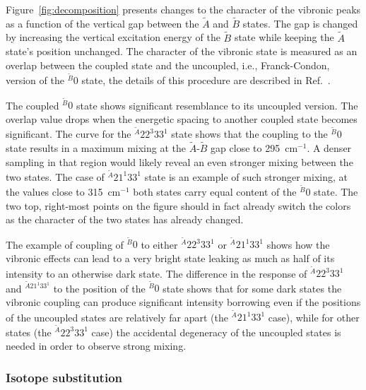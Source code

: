 \documentclass{article}
\begin{document}
Figure~\ref{fig:decomposition} presents changes to the character of the
vibronic peaks as a function of the vertical gap between the $\tilde{A}$ and
$\tilde{B}$ states. The gap is changed by increasing the vertical excitation
energy of the $\tilde{B}$ state while keeping the $\tilde{A}$ state's position
unchanged. The character of the vibronic state is measured as an overlap
between the coupled state and the uncoupled, i.e., Franck-Condon, version of
the $^{\tilde{B}}0$ state, the details of this procedure are described in
Ref.~\cite{Wojcik:ozone:2024}.

The coupled $^{\tilde{B}}0$ state shows significant resemblance to its
uncoupled version. The overlap value drops when the energetic spacing to
another coupled state becomes significant. The curve for the $^{\tilde{A}}22^3
33^1$ state shows that the coupling to the $^{\tilde{B}}0$ state results in a
maximum mixing at the $\tilde{A}$-$\tilde{B}$ gap close to 295~cm$^{-1}$. A
denser sampling in that region would likely reveal an even stronger mixing
between the two states. The case of $^{\tilde{A}}21 ^1 33 ^1$ state is an
example of such stronger mixing, at the values close to 315~cm$^{-1}$ both
states carry equal content of the $^{\tilde{B}}0$ state. The two top,
right-most points on the figure should in fact already switch the colors as the
character of the two states has already changed.

The example of coupling of $^{\tilde{B}}0$ to either $^{\tilde{A}}22^3 33^1$ or
$^{\tilde{A}}21 ^1 33 ^1$ shows how the vibronic effects can lead to a very
bright state leaking as much as half of its intensity to an otherwise dark
state. The difference in the response of $^{\tilde{A}}22 ^3 33 ^1$ and
$^{\tilde{A}21^1 33^1}$ to the position of the $^{\tilde{B}}0$ state shows that
for some dark states the vibronic coupling can produce significant intensity
borrowing even if the positions of the uncoupled states are relatively far
apart (the $^{\tilde{A}}21 ^1 33 ^1$ case), while for other states (the
$^{\tilde{A}} 22 ^3 33^1$ case) the accidental degeneracy of the uncoupled
states is needed in order to observe strong mixing.


\subsubsection{Isotope substitution}
\label{sec:results:simulations:isotope}
\end{document}
